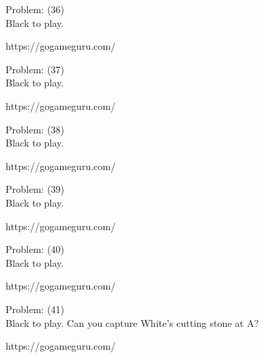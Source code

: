 \documentclass[11pt]{article}
\begin{document}
\begin{minipage}[t]{0.5\textwidth}
  {\centering
  
  Problem: (36)\\
  Black to play.

https://gogameguru.com/\\
  }
\end{minipage}
\begin{minipage}[t]{0.5\textwidth}
  {\centering
  
  Problem: (37)\\
  Black to play.

https://gogameguru.com/\\
  }
\end{minipage}
\begin{minipage}[t]{0.5\textwidth}
  {\centering
  
  Problem: (38)\\
  Black to play.

https://gogameguru.com/\\
  }
\end{minipage}
\begin{minipage}[t]{0.5\textwidth}
  {\centering
  
  Problem: (39)\\
  Black to play.

https://gogameguru.com/\\
  }
\end{minipage}
\begin{minipage}[t]{0.5\textwidth}
  {\centering
  
  Problem: (40)\\
  Black to play.

https://gogameguru.com/\\
  }
\end{minipage}
\begin{minipage}[t]{0.5\textwidth}
  {\centering
  
  Problem: (41)\\
  Black to play. Can you capture White's cutting stone at A?

https://gogameguru.com/\\
  }
\end{minipage}
\end{document}
